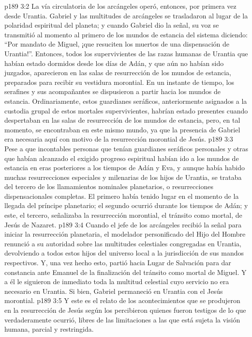 \vs p189 3:2 La vía circulatoria de los arcángeles operó, entonces, por primera vez desde Urantia. Gabriel y las multitudes de arcángeles se trasladaron al lugar de la polaridad espiritual del planeta; y cuando Gabriel dio la señal, su voz se transmitió al momento al primero de los mundos de estancia del sistema diciendo: “Por mandato de Miguel, ¡que resuciten los muertos de una dispensación de Urantia!”. Entonces, todos los supervivientes de las razas humanas de Urantia que habían estado dormidos desde los días de Adán, y que aún no habían sido juzgados, aparecieron en las salas de resurrección de los mundos de estancia, preparados para recibir su vestidura morontial. En un instante de tiempo, los serafines y sus acompañantes se dispusieron a partir hacia los mundos de estancia. Ordinariamente, estos guardianes seráficos, anteriormente asignados a la custodia grupal de estos mortales supervivientes, habrían estado presentes cuando despertaban en las salas de resurrección de los mundos de estancia, pero, en tal momento, se encontraban en este mismo mundo, ya que la presencia de Gabriel era necesaria aquí con motivo de la resurrección morontial de Jesús.
\vs p189 3:3 Pese a que incontables personas que tenían guardianes seráficos personales y otras que habían alcanzado el exigido progreso espiritual habían ido a los mundos de estancia en eras posteriores a los tiempos de Adán y Eva, y aunque había habido muchas resurrecciones especiales y milenarias de los hijos de Urantia, se trataba del tercero de los llamamientos nominales planetarios, o resurrecciones dispensacionales completas. El primero había tenido lugar en el momento de la llegada del príncipe planetario; el segundo ocurrió durante los tiempos de Adán; y este, el tercero, señalizaba la resurrección morontial, el tránsito como mortal, de Jesús de Nazaret.
\vs p189 3:4 \pc Cuando el jefe de los arcángeles recibió la señal para iniciar la resurrección planetaria, el modelador personificado del Hijo del Hombre renunció a su autoridad sobre las multitudes celestiales congregadas en Urantia, devolviendo a todos estos hijos del universo local a la jurisdicción de sus mandos respectivos. Y, una vez hecho esto, partió hacia Lugar de Salvación para dar constancia ante Emanuel de la finalización del tránsito como mortal de Miguel. Y a él le siguieron de inmediato toda la multitud celestial cuyo servicio no era necesario en Urantia. Si bien, Gabriel permaneció en Urantia con el Jesús morontial.
\vs p189 3:5 \pc Y este es el relato de los acontecimientos que se produjeron en la resurrección de Jesús según los percibieron quienes fueron testigos de lo que verdaderamente ocurrió, libres de las limitaciones a las que está sujeta la visión humana, parcial y restringida.
